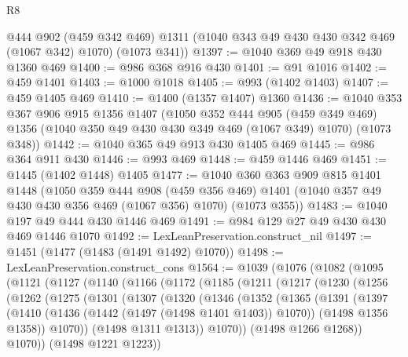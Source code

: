 \begin{lexlean}{R8}
\begin{coremodule}
      @444
      @902
      (@459 @342 @469)
      @1311
      (@1040 @343 @49 @430 @430 @342 @469 (@1067 @342) @1070)
      (@1073 @341))
@1397 := @1040 @369 @49 @918 @430 @1360 @469
@1400 := @986 @368 @916 @430
@1401 := @91 @1016
@1402 := @459 @1401
@1403 := @1000 @1018
@1405 := @993 (@1402 @1403)
@1407 := @459 @1405 @469
@1410 := @1400 (@1357 @1407) @1360
@1436 := @1040
    @353
    @367
    @906
    @915
    @1356
    @1407
    (@1050
      @352
      @444
      @905
      (@459 @349 @469)
      @1356
      (@1040 @350 @49 @430 @430 @349 @469 (@1067 @349) @1070)
      (@1073 @348))
@1442 := @1040 @365 @49 @913 @430 @1405 @469
@1445 := @986 @364 @911 @430
@1446 := @993 @469
@1448 := @459 @1446 @469
@1451 := @1445 (@1402 @1448) @1405
@1477 := @1040
    @360
    @363
    @909
    @815
    @1401
    @1448
    (@1050
      @359
      @444
      @908
      (@459 @356 @469)
      @1401
      (@1040 @357 @49 @430 @430 @356 @469 (@1067 @356) @1070)
      (@1073 @355))
@1483 := @1040 @197 @49 @444 @430 @1446 @469
@1491 := @984 @129 @27 @49 @430 @430 @469 @1446 @1070
@1492 := LexLeanPreservation.construct_nil
@1497 := @1451 (@1477 (@1483 (@1491 @1492) @1070))
@1498 := LexLeanPreservation.construct_cons
@1564 := @1039
    (@1076
      (@1082
        (@1095
          (@1121
            (@1127
              (@1140
                (@1166
                  (@1172
                    (@1185
                      (@1211
                        (@1217
                          (@1230
                            (@1256
                              (@1262
                                (@1275
                                  (@1301
                                    (@1307
                                      (@1320
                                        (@1346
                                          (@1352
                                            (@1365
                                              (@1391
                                                (@1397
                                                  (@1410
                                                    (@1436
                                                      (@1442 (@1497 (@1498 @1401 @1403)) @1070))
                                                    (@1498 @1356 @1358))
                                                  @1070))
                                              (@1498 @1311 @1313))
                                            @1070))
                                        (@1498 @1266 @1268))
                                      @1070))
                                  (@1498 @1221 @1223))

\end{coremodule}
\end{lexlean}
